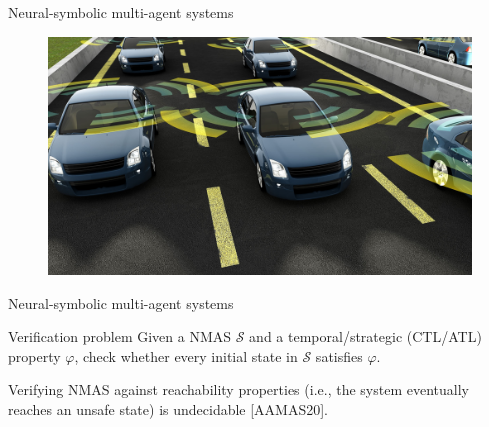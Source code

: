 \documentclass[10pt]{beamer}
\begin{document}

\begin{frame}{Neural-symbolic multi-agent systems}

\begin{figure}
	\centering
	\includegraphics[width=\textwidth]{cars.jpg}
\end{figure}

\end{frame}


\begin{frame}{Neural-symbolic multi-agent systems}

  \begin{block}{Verification problem}
	  Given a NMAS $\mathcal S$ and a temporal/strategic (CTL/ATL)
	  property $\varphi$, check whether every initial state in
  $\mathcal S$ 
	  satisfies $\varphi$.
  \end{block}

	
 	\vspace{3em}

  
  \begin{theorem}
	  Verifying NMAS against reachability properties (i.e., the system
	  eventually reaches an unsafe state) is undecidable [AAMAS20].
  \end{theorem}

\end{frame}

\end{document}
